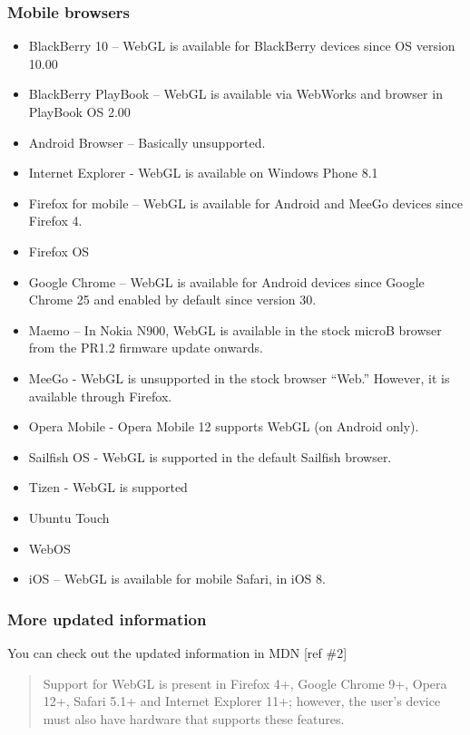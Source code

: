 \subsubsection{Mobile browsers}\label{mobile-browsers}

\begin{itemize}
\tightlist
\item
  BlackBerry 10 -- WebGL is available for BlackBerry devices since OS
  version 10.00
\item
  BlackBerry PlayBook -- WebGL is available via WebWorks and browser in
  PlayBook OS 2.00
\item
  Android Browser -- Basically unsupported.
\item
  Internet Explorer - WebGL is available on Windows Phone 8.1
\item
  Firefox for mobile -- WebGL is available for Android and MeeGo devices
  since Firefox 4.
\item
  Firefox OS
\item
  Google Chrome -- WebGL is available for Android devices since Google
  Chrome 25 and enabled by default since version 30.
\item
  Maemo -- In Nokia N900, WebGL is available in the stock microB browser
  from the PR1.2 firmware update onwards.
\item
  MeeGo - WebGL is unsupported in the stock browser ``Web.'' However, it
  is available through Firefox.
\item
  Opera Mobile - Opera Mobile 12 supports WebGL (on Android only).
\item
  Sailfish OS - WebGL is supported in the default Sailfish browser.
\item
  Tizen - WebGL is supported
\item
  Ubuntu Touch
\item
  WebOS
\item
  iOS -- WebGL is available for mobile Safari, in iOS 8.
\end{itemize}

\subsubsection{More updated information}\label{more-updated-information}

You can check out the updated information in MDN {[}ref \#2{]}

\begin{quote}
Support for WebGL is present in Firefox 4+, Google Chrome 9+, Opera 12+,
Safari 5.1+ and Internet Explorer 11+; however, the user's device must
also have hardware that supports these features.
\end{quote}

